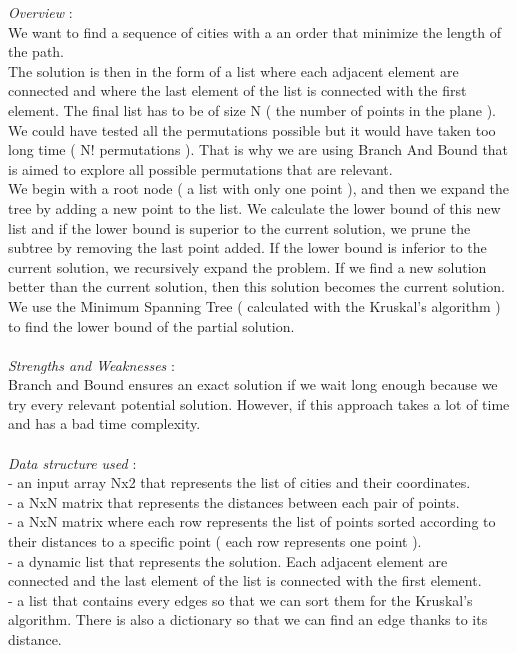 \documentclass[12pt]{article}
\begin{document}
\textit{Overview} : \\
We want to find a sequence of cities with a an order that minimize the length of the path. \\
The solution is then in the form of a list where each adjacent element are connected and where the last element of the list is connected with the first element. The final list has to be of size N ( the number of points in the plane ). We could have tested all the permutations possible but it would have taken too long time ( N! permutations ). That is why we are using Branch And Bound that is aimed to explore all possible permutations that are relevant.\\
We begin with a root node ( a list with only one point ), and then we expand the tree by adding a new point to the list. We calculate the lower bound of this new list and if the lower bound is superior to the current solution, we prune the subtree by removing the last point added. If the lower bound is inferior to the current solution, we recursively expand the problem. If we find a new solution better than the current solution, then this solution becomes the current solution. \\
We use the Minimum Spanning Tree ( calculated with the Kruskal's algorithm ) to find the lower bound of the partial solution. \\
\\
\textit{Strengths and Weaknesses} : \\
Branch and Bound ensures an exact solution if we wait long enough because we try every relevant potential solution. However, if this approach takes a lot of time and has a bad time complexity.\\
\\
\textit{Data structure used} : \\
- an input array Nx2 that represents the list of cities and their coordinates. \\
- a NxN matrix that represents the distances between each pair of points. \\
- a NxN matrix where each row represents the list of points sorted according to their distances to a specific point ( each row represents one point ). \\
- a dynamic list that represents the solution. Each adjacent element are connected and the last element of the list is connected with the first element. \\
- a list that contains every edges so that we can sort them for the Kruskal's algorithm. There is also a dictionary so that we can find an edge thanks to its distance. \\
\end{document}
